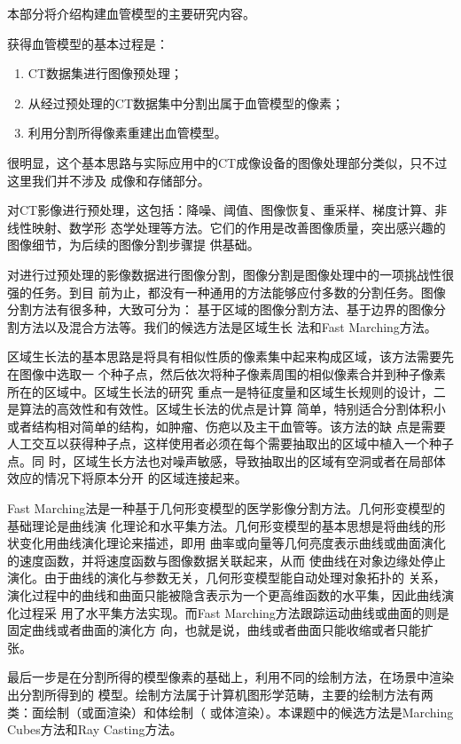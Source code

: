 本部分将介绍构建血管模型的主要研究内容。

获得血管模型的基本过程是：
\begin{enumerate}
  \item CT数据集进行图像预处理；
  \item 从经过预处理的CT数据集中分割出属于血管模型的像素；
  \item 利用分割所得像素重建出血管模型。
\end{enumerate}
很明显，这个基本思路与实际应用中的CT成像设备的图像处理部分类似，只不过这里我们并不涉及
成像和存储部分。

对CT影像进行预处理，这包括：降噪、阈值、图像恢复、重采样、梯度计算、非线性映射、数学形
态学处理等方法。它们的作用是改善图像质量，突出感兴趣的图像细节，为后续的图像分割步骤提
供基础。

对进行过预处理的影像数据进行图像分割，图像分割是图像处理中的一项挑战性很强的任务。到目
前为止，都没有一种通用的方法能够应付多数的分割任务。图像分割方法有很多种，大致可分为：
基于区域的图像分割方法、基于边界的图像分割方法以及混合方法等。我们的候选方法是区域生长
法和Fast Marching方法。

区域生长法的基本思路是将具有相似性质的像素集中起来构成区域，该方法需要先在图像中选取一
个种子点，然后依次将种子像素周围的相似像素合并到种子像素所在的区域中。区域生长法的研究
重点一是特征度量和区域生长规则的设计，二是算法的高效性和有效性。区域生长法的优点是计算
简单，特别适合分割体积小或者结构相对简单的结构，如肿瘤、伤疤以及主干血管等。该方法的缺
点是需要人工交互以获得种子点，这样使用者必须在每个需要抽取出的区域中植入一个种子点。同
时，区域生长方法也对噪声敏感，导致抽取出的区域有空洞或者在局部体效应的情况下将原本分开
的区域连接起来。

Fast Marching法是一种基于几何形变模型的医学影像分割方法。几何形变模型的基础理论是曲线演
化理论和水平集方法。几何形变模型的基本思想是将曲线的形状变化用曲线演化理论来描述，即用
曲率或向量等几何亮度表示曲线或曲面演化的速度函数，并将速度函数与图像数据关联起来，从而
使曲线在对象边缘处停止演化。由于曲线的演化与参数无关，几何形变模型能自动处理对象拓扑的
关系，演化过程中的曲线和曲面只能被隐含表示为一个更高维函数的水平集，因此曲线演化过程采
用了水平集方法实现。而Fast Marching方法跟踪运动曲线或曲面的则是固定曲线或者曲面的演化方
向，也就是说，曲线或者曲面只能收缩或者只能扩张。

最后一步是在分割所得的模型像素的基础上，利用不同的绘制方法，在场景中渲染出分割所得到的
模型。绘制方法属于计算机图形学范畴，主要的绘制方法有两类：面绘制（或面渲染）和体绘制（
或体渲染）。本课题中的候选方法是Marching Cubes方法和Ray Casting方法。

